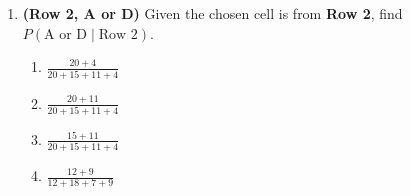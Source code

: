 \documentclass[12pt]{article}
\begin{document}
\begin{enumerate}[label=\textbf{S\arabic*.}]
\item \textbf{(Row 2, A or D)} Given the chosen cell is from \textbf{Row 2}, find $P(\text{A or D}\mid \text{Row 2})$. 

\begin{enumerate}
\item $\displaystyle \frac{20+4}{20+15+11+4}$
\item $\displaystyle \frac{20+11}{20+15+11+4}$
\item $\displaystyle \frac{15+11}{20+15+11+4}$
\item $\displaystyle \frac{12+9}{12+18+7+9}$
\end{enumerate}

\end{enumerate}
\end{document}
